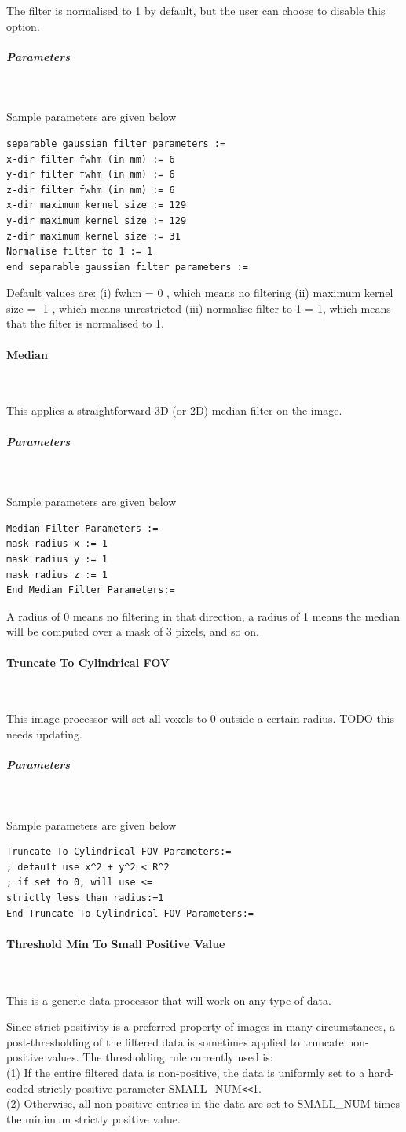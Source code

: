 \documentclass{article}
\newcommand{\tab}{\hspace{5mm}}
\newcommand{\subsubsubsection}[1]{\paragraph{#1}\mbox{} \\}
\newcommand{\subsubsubsubsection}[1]{\subparagraph{#1} \mbox{} \\}
\begin{document}
{{The filter is normalised to 1 by default, but the user can choose to disable this option.


{ \subsubsubsubsection{Parameters}
}
Sample parameters are given below
\begin{verbatim}
separable gaussian filter parameters :=
x-dir filter fwhm (in mm) := 6
y-dir filter fwhm (in mm) := 6
z-dir filter fwhm (in mm) := 6
x-dir maximum kernel size := 129
y-dir maximum kernel size := 129
z-dir maximum kernel size := 31
Normalise filter to 1 := 1
end separable gaussian filter parameters :=
\end{verbatim}

Default values are:
(i) fwhm = 0 , which means no filtering
(ii) maximum kernel size = -1 , which means unrestricted
(iii) normalise filter to 1 = 1, which means that the filter is normalised to 1.

{ \subsubsubsection{Median}
}
\label{sec:median}
This applies a straightforward 3D (or 2D) median filter on the 
image.

{ \subsubsubsubsection{Parameters}
}
Sample parameters are given below
\begin{verbatim}
Median Filter Parameters := 
mask radius x := 1  
mask radius y := 1 
mask radius z := 1 
End Median Filter Parameters:=
\end{verbatim}


A radius of 0 means no filtering in that direction, a radius 
of 1 means the median will be computed over a mask of 3 pixels, 
and so on.


{ \subsubsubsection{Truncate To Cylindrical FOV}
}
This image processor will set all voxels to 0 outside a certain radius.
TODO this needs updating.
{ \subsubsubsubsection{Parameters}
}
Sample parameters are given below
\begin{verbatim}
Truncate To Cylindrical FOV Parameters:=
; default use x^2 + y^2 < R^2
; if set to 0, will use <=
strictly_less_than_radius:=1 
End Truncate To Cylindrical FOV Parameters:=
\end{verbatim}

{ \subsubsubsection{Threshold Min To Small Positive Value}
}
This is a generic data processor that will work on any type of data.

Since strict positivity is a preferred property of images in 
many circumstances, a post-thresholding of the filtered data 
is sometimes applied to truncate non-positive values. The thresholding 
rule currently used is:\\
(1)\tab 
If the entire filtered data is non-positive, the data is uniformly 
set to a hard-coded strictly positive parameter SMALL\_NUM\texttt{<}\texttt{<}1.\\
(2)\tab 
Otherwise, all non-positive entries in the data are set to SMALL\_NUM 
times the minimum strictly positive value.

}}
\end{document}
